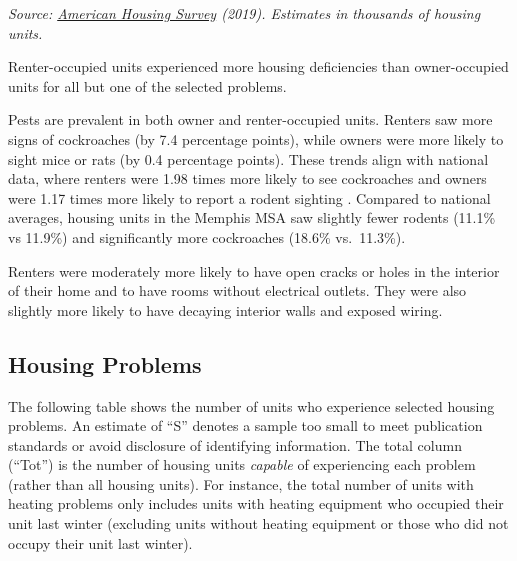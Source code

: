 \documentclass[
]{book}
\begin{document}
\emph{Source: \href{https://www.census.gov/newsroom/press-releases/2020/2019-american-housing-survey.html}{American Housing Survey} (2019). Estimates in thousands of housing units.}

Renter-occupied units experienced more housing deficiencies than owner-occupied units for all but one of the selected problems.

Pests are prevalent in both owner and renter-occupied units. Renters saw more signs of cockroaches (by 7.4 percentage points), while owners were more likely to sight mice or rats (by 0.4 percentage points). These trends align with national data, where renters were 1.98 times more likely to see cockroaches and owners were 1.17 times more likely to report a rodent sighting \citep{sellner2021}. Compared to national averages, housing units in the Memphis MSA saw slightly fewer rodents (11.1\% vs 11.9\%) and significantly more cockroaches (18.6\% vs.~11.3\%).

Renters were moderately more likely to have open cracks or holes in the interior of their home and to have rooms without electrical outlets. They were also slightly more likely to have decaying interior walls and exposed wiring.

\hypertarget{housing-problems}{%
\subsection{Housing Problems}\label{housing-problems}}

The following table shows the number of units who experience selected housing problems. An estimate of ``S'' denotes a sample too small to meet publication standards or avoid disclosure of identifying information. The total column (``Tot'') is the number of housing units \emph{capable} of experiencing each problem (rather than all housing units). For instance, the total number of units with heating problems only includes units with heating equipment who occupied their unit last winter (excluding units without heating equipment or those who did not occupy their unit last winter).
\end{document}
